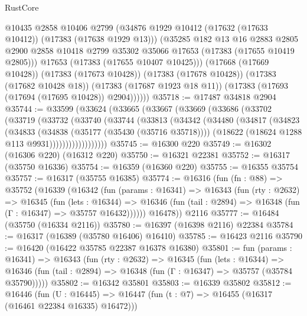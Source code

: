 \begin{lexlean}{RustCore}
\begin{coremodule}
              @10435
              @2858
              @10406
              @2799
              (@34876 @1929 @10412 (@17632 (@17633 @10412)) (@17383 (@17638 @1929 @13)))
              (@35285
                @182
                @13
                @16
                @2883
                @2805
                @2900
                @2858
                @10418
                @2799
                @35302
                @35066
                @17653
                (@17383 (@17655 @10419 @2805)))
              @17653
              (@17383 (@17655 @10407 @10425)))
            (@17668 (@17669 @10428))
            (@17383 (@17673 @10428))
            (@17383 (@17678 @10428))
            (@17383 (@17682 @10428 @18))
            (@17383 (@17687 @1923 @18 @11))
            (@17383 (@17693 (@17694 (@17695 @10428)) @2904))))))
@35718 := @17487 @34818 @2904
@35744 := @33599
    (@33624
      (@33665
        (@33667
          (@33669
            (@33686
              (@33702
                (@33719
                  (@33732
                    (@33740
                      (@33744
                        (@33813
                          (@34342
                            (@34480
                              (@34817
                                (@34823
                                  (@34833
                                    (@34838 (@35177 (@35430 (@35716 @35718))))
                                    (@18622 (@18624 @1288 @113 @9931))))))))))))))))))
@35745 := @16300 @220
@35749 := @16302 (@16306 @220) (@16312 @220)
@35750 := @16321 @22381
@35752 := @16317 (@35750 @16336)
@35754 := @16359 (@16360 @220)
@35755 := @16355 @35754
@35757 := @16317 (@35755 @16385)
@35774 := @16316
    (fun (fn : @88) =>
    @35752
      (@16339
        (@16342
          (fun (params : @16341) =>
          @16343
            (fun (rty : @2632) =>
            @16345
              (fun (lets : @16344) =>
              @16346 (fun (tail : @2894) => @16348 (fun (Γ : @16347) => @35757 @16432))))))
        @16478))
    @2116
@35777 := @16484 (@35750 (@16334 @2116))
@35780 := @16397 (@16398 @2116) @22384
@35784 := @16317 (@16389 (@35780 @16406) @16410)
@35785 := @16423 @2116
@35790 := @16420 (@16422 @35785 @22387 @16378 @16380)
@35801 := fun (params : @16341) =>
  @16343
    (fun (rty : @2632) =>
    @16345
      (fun (lets : @16344) =>
      @16346 (fun (tail : @2894) => @16348 (fun (Γ : @16347) => @35757 (@35784 @35790)))))
@35802 := @16342 @35801
@35803 := @16339 @35802
@35812 := @16446
    (fun (U : @16445) => @16447 (fun (t : @7) => @16455 (@16317 (@16461 @22384 @16335) @16472)))

\end{coremodule}
\end{lexlean}

